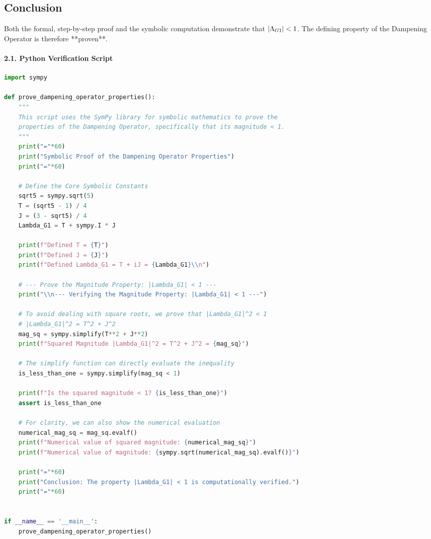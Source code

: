 \subsection*{Conclusion}
Both the formal, step-by-step proof and the symbolic computation demonstrate that $|\Lambda_{G1}| < 1$. The defining property of the Dampening Operator is therefore **proven**.
\newpage
\newpage

\paragraph{2.1. Python Verification Script}
\begin{lstlisting}[language=Python, caption={Python script to symbolically prove the properties of the Dampening Operator.}, label={lst:dampening_op_proof}]
import sympy

def prove_dampening_operator_properties():
    """
    This script uses the SymPy library for symbolic mathematics to prove the
    properties of the Dampening Operator, specifically that its magnitude < 1.
    """
    print("="*60)
    print("Symbolic Proof of the Dampening Operator Properties")
    print("="*60)

    # Define the Core Symbolic Constants
    sqrt5 = sympy.sqrt(5)
    T = (sqrt5 - 1) / 4
    J = (3 - sqrt5) / 4
    Lambda_G1 = T + sympy.I * J

    print(f"Defined T = {T}")
    print(f"Defined J = {J}")
    print(f"Defined Lambda_G1 = T + iJ = {Lambda_G1}\\n")

    # --- Prove the Magnitude Property: |Lambda_G1| < 1 ---
    print("\\n--- Verifying the Magnitude Property: |Lambda_G1| < 1 ---")

    # To avoid dealing with square roots, we prove that |Lambda_G1|^2 < 1
    # |Lambda_G1|^2 = T^2 + J^2
    mag_sq = sympy.simplify(T**2 + J**2)
    print(f"Squared Magnitude |Lambda_G1|^2 = T^2 + J^2 = {mag_sq}")

    # The simplify function can directly evaluate the inequality
    is_less_than_one = sympy.simplify(mag_sq < 1)

    print(f"Is the squared magnitude < 1? {is_less_than_one}")
    assert is_less_than_one

    # For clarity, we can also show the numerical evaluation
    numerical_mag_sq = mag_sq.evalf()
    print(f"Numerical value of squared magnitude: {numerical_mag_sq}")
    print(f"Numerical value of magnitude: {sympy.sqrt(numerical_mag_sq).evalf()}")

    print("="*60)
    print("Conclusion: The property |Lambda_G1| < 1 is computationally verified.")
    print("="*60)


if __name__ == '__main__':
    prove_dampening_operator_properties()
\end{lstlisting}

